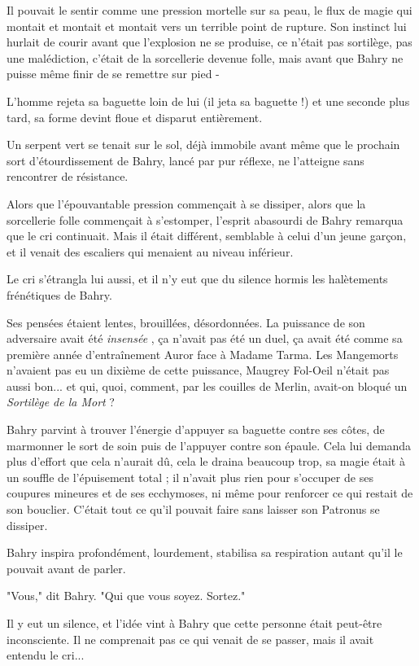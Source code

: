Il pouvait le sentir comme une pression mortelle sur sa peau, le flux de magie qui montait et montait et montait vers un terrible point de rupture. Son instinct lui hurlait de courir avant que l'explosion ne se produise, ce n'était pas sortilège, pas une malédiction, c'était de la sorcellerie devenue folle, mais avant que Bahry ne puisse même finir de se remettre sur pied -

L'homme rejeta sa baguette loin de lui (il jeta sa baguette !) et une seconde plus tard, sa forme devint floue et disparut entièrement.

Un serpent vert se tenait sur le sol, déjà immobile avant même que le prochain sort d'étourdissement de Bahry, lancé par pur réflexe, ne l'atteigne sans rencontrer de résistance.

Alors que l'épouvantable pression commençait à se dissiper, alors que la sorcellerie folle commençait à s'estomper, l'esprit abasourdi de Bahry remarqua que le cri continuait. Mais il était différent, semblable à celui d'un jeune garçon, et il venait des escaliers qui menaient au niveau inférieur.

Le cri s'étrangla lui aussi, et il n'y eut que du silence hormis les halètements frénétiques de Bahry.

Ses pensées étaient lentes, brouillées, désordonnées. La puissance de son adversaire avait été \emph{insensée} , ça n'avait pas été un duel, ça avait été comme sa première année d'entraînement Auror face à Madame Tarma. Les Mangemorts n'avaient pas eu un dixième de cette puissance, Maugrey Fol-Oeil n'était pas aussi bon... et qui, quoi, comment, par les couilles de Merlin, avait-on bloqué un \emph{Sortilège de la Mort}  ?

Bahry parvint à trouver l'énergie d'appuyer sa baguette contre ses côtes, de marmonner le sort de soin puis de l'appuyer contre son épaule. Cela lui demanda plus d'effort que cela n'aurait dû, cela le draina beaucoup trop, sa magie était à un souffle de l'épuisement total ; il n'avait plus rien pour s'occuper de ses coupures mineures et de ses ecchymoses, ni même pour renforcer ce qui restait de son bouclier. C'était tout ce qu'il pouvait faire sans laisser son Patronus se dissiper.

Bahry inspira profondément, lourdement, stabilisa sa respiration autant qu'il le pouvait avant de parler.

"Vous," dit Bahry. "Qui que vous soyez. Sortez."

Il y eut un silence, et l'idée vint à Bahry que cette personne était peut-être inconsciente. Il ne comprenait pas ce qui venait de se passer, mais il avait entendu le cri...

